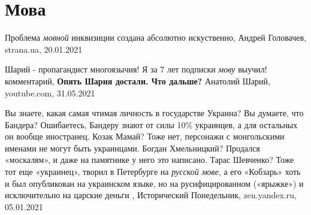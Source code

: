  
 
 
 
 
\chapter{Мова}

Проблема \emph{мовной} инквизиции создана абсолютно искуственно, Андрей
Головачев, strana.ua, 20.01.2021

Шарий - пропагандист многоязычия! Я за 7 лет подписки \emph{мову} выучил!
комментарий, \textbf{Опять Шария достали. Что дальше?} Анатолий Шарий,
youtube.com, 31.05.2021

Вы знаете, какая самая чтимая личность в государстве Украина? Вы думаете, что
Бандера? Ошибаетесь, Бандеру знают от силы 10\% украинцев, а для остальных он
вообще иностранец. Козак Мамай? Тоже нет, персонажи с монгольскими именами не
могут быть украинцами. Богдан Хмельницкий? Продался «москалям», и даже на
памятнике у него это написано.  Тарас Шевченко? Тоже тот еще «украинец», творил
в Петербурге на \emph{русской мове}, а его «Кобзарь» хоть и был опубликован на
украинском языке, но на русифицированном («ярыжке») и исключительно на царские
деньги
,
Исторический Понедельник, zen.yandex.ru, 05.01.2021 

